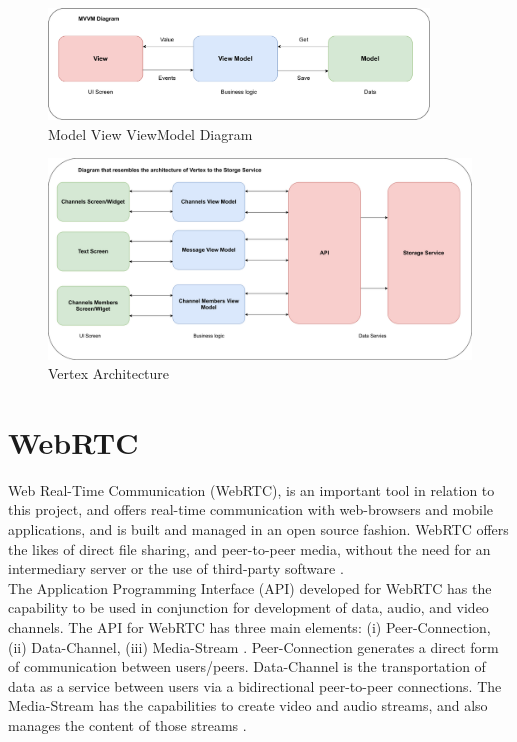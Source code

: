 \begin{figure}[h!]
    \caption{Model View ViewModel Diagram}
    \label{image:mvvmDiagram}
    \centering
    \includegraphics[width=0.9\textwidth]{images/mvvm_diagram.png}
\end{figure}

\begin{figure}[h!]
    \caption{Vertex Architecture}
    \label{image:vertexArch}
    \centering
    \includegraphics[width=1.0\textwidth]{images/vertex_arch.png}
\end{figure}

\section{WebRTC}
Web Real-Time Communication (WebRTC), is an important tool in relation to this project, and offers real-time communication with web-browsers and mobile applications, and is built and managed in an open source fashion. WebRTC offers the likes of direct file sharing, and peer-to-peer media, without the need for an intermediary server or the use of third-party software \cite{johnston2012webrtc}. 
\\The Application Programming Interface (API) developed for WebRTC has the capability to be used in conjunction for development of data, audio, and video channels. The API for WebRTC has three main elements: (i) Peer-Connection, (ii) Data-Channel, (iii) Media-Stream \cite{jesup2015webrtc}. Peer-Connection generates a direct form of communication between users/peers. Data-Channel is the transportation of data as a service between users via a bidirectional peer-to-peer connections. The Media-Stream has the capabilities  to create video and audio streams, and also manages the content of those streams \cite{14003034520191201}.

